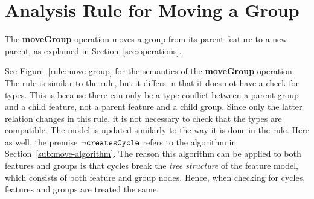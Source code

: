 \section{Analysis Rule for Moving a Group}
\label{sec:move-group-rule}
The \textbf{moveGroup} operation moves a group from its parent feature to a new parent, as explained in Section~\ref{sec:operations}.

See Figure~\ref{rule:move-group} for the semantics of the \textbf{moveGroup} operation. The rule is similar to the  rule, but it differs in that it does not have a check for types. This is because there can only be a type conflict between a parent group and a child feature, not a parent feature and a child group. Since only the latter relation changes in this rule, it is not necessary to check that the types are compatible. The model is updated similarly to the way it is done in the  rule. Here as well, the premise $\neg \texttt{createsCycle}$ refers to the algorithm in Section~\ref{sub:move-algorithm}. The reason this algorithm can be applied to both features and groups is that cycles break the \emph{tree structure} of the feature model, which consists of both feature and group nodes. Hence, when checking for cycles, features and groups are treated the same.

